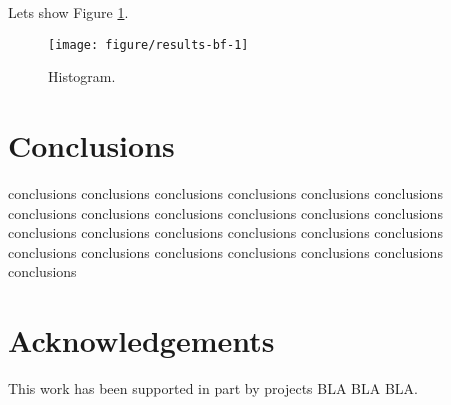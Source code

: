 \documentclass[runningheads,a4paper]{llncs}\usepackage[]{graphicx}\usepackage[]{color}
\newenvironment{knitrout}{}{} %
\begin{document}
Lets show Figure \ref{fig:time}.

\begin{figure}[h!tb]
  \centering
\begin{knitrout}
\color{fgcolor}
\texttt{[image: figure/results-bf-1]} 

\end{knitrout}
\caption{Histogram.}
\label{fig:time}
\end{figure}


\section{Conclusions}

conclusions conclusions conclusions conclusions conclusions 
conclusions conclusions conclusions conclusions conclusions 
conclusions conclusions conclusions conclusions conclusions 
conclusions conclusions conclusions conclusions conclusions 
conclusions conclusions conclusions conclusions conclusions 


\section{Acknowledgements}
This work has been supported in part by projects BLA BLA BLA.



\end{document}
